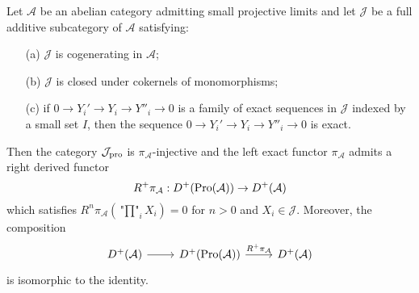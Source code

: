 \begin{proposition}\label{derived category derived functor of proj limit}
Let $\mathcal{A}$ be an abelian category admitting small projective limits and let $\mathcal{J}$ be a full additive subcategory of $\mathcal{A}$ satisfying:
\begin{enumerate}
    \item[(a)] $\mathcal{J}$ is cogenerating in $\mathcal{A}$;
    \item[(b)] $\mathcal{J}$ is closed under cokernels of monomorphisms;
    \item[(c)] if $0\to Y_i'\to Y_i\to Y''_i\to 0$ is a family of exact sequences in $\mathcal{J}$ indexed by a small set $I$, then the sequence $0\to Y_i'\to Y_i\to Y''_i\to 0$ is exact.
\end{enumerate}
Then the category $\mathcal{J}_{\mathrm{pro}}$ is $\pi_\mathcal{A}$-injective and the left exact functor $\pi_\mathcal{A}$ admits a right derived functor
\[R^+\pi_\mathcal{A}:D^+(\mathrm{Pro}(\mathcal{A}))\to D^+(\mathcal{A})\]
which satisfies $R^n\pi_\mathcal{A}(\underset{i}{\text{"$\prod$"}}X_i)=0$ for $n>0$ and $X_i\in\mathcal{J}$. Moreover, the composition
\[\begin{tikzcd}
D^+(\mathcal{A})\ar[r]&D^+(\Pro(\mathcal{A}))\ar[r,"R^+\pi_\mathcal{A}"]&D^+(\mathcal{A})
\end{tikzcd}\]
is isomorphic to the identity.
\end{proposition}
